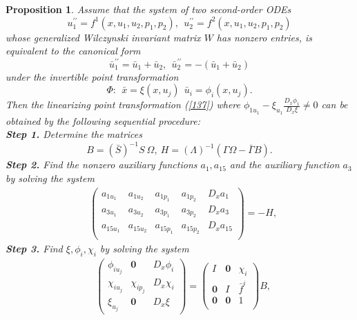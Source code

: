 \documentclass[10pt,a4paper]{amsart}
\newtheorem{proposition}{Proposition}
\begin{document}
\begin{proposition}\label{s3-8}
Assume that the system of two second-order ODEs
\begin{equation}\label{136}
u_1^{\prime\prime}=f^1(x,u_1,u_2,p_1,p_2),~~u_2^{\prime\prime}=f^2(x,u_1,u_2,p_1,p_2)
\end{equation}
 whose generalized Wilczynski invariant matrix $W$ has nonzero entries, is equivalent to the canonical form
\begin{equation}\label{138}
\bar{u}_1^{\prime\prime}=\bar{u}_1+\bar{u}_2,~~\bar{u}_2^{\prime\prime}=-(\bar{u}_1+\bar{u}_2)
\end{equation}
under the invertible point transformation
\begin{equation}\label{137}
\Phi:~~\bar{x}=\xi(x,u_j)~~\bar{u}_i=\phi_{i}(x,u_j).
\end{equation}
Then the linearizing point transformation (\ref{137}) where $\phi_{1u_1}-\xi_{u_1}\frac{D_x\phi_1}{D_x\xi}\neq0$
can be obtained by the following sequential procedure:\\
\textbf{Step 1.}  Determine the matrices 
\begin{equation}\label{s3-12}
B=(\bar{S})^{-1}S~\Omega, ~H=(\Lambda)^{-1}(\Gamma\Omega-\bar{\Gamma}B).
\end{equation}
 \textbf{Step 2.} Find the nonzero auxiliary functions $a_1,a_{15}$ and the auxiliary function $a_3$ by solving the system \\
\begin{equation}\label{168}
\begin{aligned}
&\begin{pmatrix}
a_{1u_1}&a_{1u_2}&a_{1p_1}&a_{1p_2}&D_xa_1\\
a_{3u_1}&a_{3u_2}&a_{3p_1}&a_{3p_2}&D_xa_3\\
a_{15u_1}&a_{15u_2}&a_{15p_1}&a_{15p_2}&D_xa_{15}\\
\end{pmatrix}=-H,
\end{aligned}
\end{equation}
\textbf{Step 3.} Find $\xi, \phi_i, \chi_i$ by solving the system
\begin{equation}\label{169}
\begin{aligned}
&\begin{pmatrix}
\phi_{iu_j}&\textbf{0}&D_x\phi_i\\
\chi_{iu_j}&\chi_{ip_j}&D_x\chi_i\\
\xi_{u_j}&\textbf{0}&D_x\xi
\end{pmatrix}=\begin{pmatrix}
I&\textbf{0}&\chi_i\\
\textbf{0}&I&\bar{f}^i\\
\textbf{0}&\textbf{0}&1\\
\end{pmatrix}B,
\end{aligned}
\end{equation}


\end{proposition}
\end{document}
